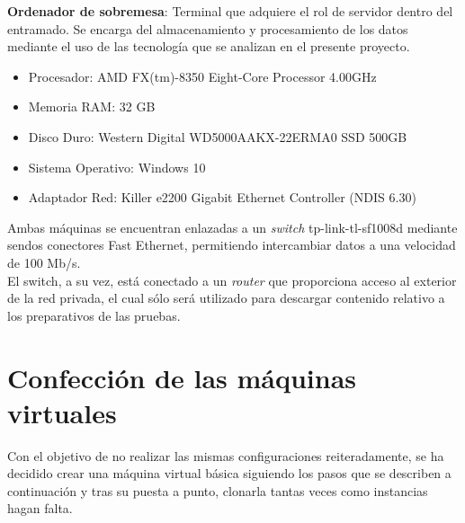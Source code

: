 \textbf{Ordenador de sobremesa}: Terminal que adquiere el rol de servidor dentro del entramado. Se encarga del almacenamiento y procesamiento de los datos mediante el uso de las tecnología que se analizan en el presente proyecto.

\begin{itemize}
	\item Procesador: AMD FX(tm)-8350 Eight-Core Processor 4.00GHz
	\item Memoria RAM: 32 GB
	\item Disco Duro: Western Digital WD5000AAKX-22ERMA0 SSD 500GB
	\item Sistema Operativo: Windows 10
	\item Adaptador Red: Killer e2200 Gigabit Ethernet Controller (NDIS 6.30)
\end{itemize}

Ambas máquinas se encuentran enlazadas a un \textit{switch} tp-link-tl-sf1008d mediante sendos conectores Fast Ethernet, permitiendo intercambiar datos a una velocidad de 100 Mb/s.\\

El switch, a su vez, está conectado a un \textit{router} que proporciona acceso al exterior de la red privada, el cual sólo será utilizado para descargar contenido relativo a los preparativos de las pruebas.

\section{Confección de las máquinas virtuales}
 
Con el objetivo de no realizar las mismas configuraciones reiteradamente, se ha decidido crear una máquina virtual básica siguiendo los pasos que se describen a continuación y tras su puesta a punto, clonarla tantas veces como instancias hagan falta.

